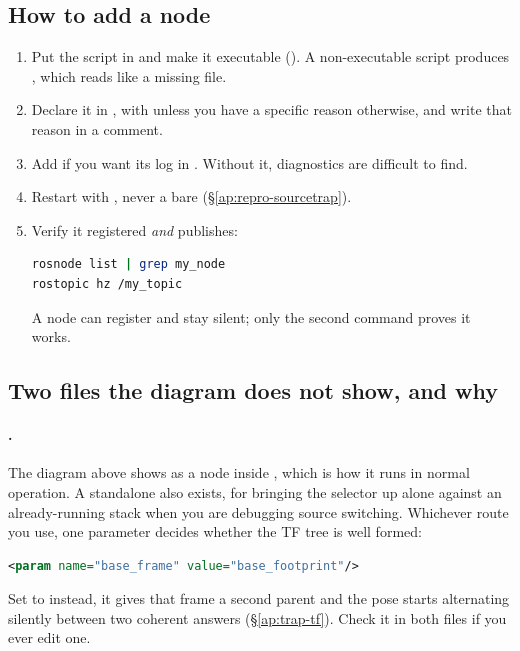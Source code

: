 \subsection{How to add a node}
\begin{enumerate}[leftmargin=1.4em]
\item Put the script in
   and make it executable
  (). A non-executable script produces
  , which reads like a missing file.
\item Declare it in , with
   unless you have a specific reason
  otherwise, and write that reason in a comment.
\item Add  if you want its log in
  . Without it, diagnostics are difficult to
  find.
\item Restart with , never a bare
   (\S\ref{ap:repro-sourcetrap}).
\item Verify it registered \emph{and} publishes:
\begin{lstlisting}[language=bash]
rosnode list | grep my_node
rostopic hz /my_topic
\end{lstlisting}
  A node can register and stay silent; only the second command proves it works.
\end{enumerate}

\subsection{Two files the diagram does not show, and why}
\label{ap:launch-notshown}

\paragraph{.} The diagram above shows
 as a node inside
, which is how it runs in normal
operation. A standalone  also exists, for
bringing the selector up alone against an already-running stack when you are
debugging source switching. Whichever route you use, one parameter decides
whether the TF tree is well formed:
\begin{lstlisting}[language=XML]
<param name="base_frame" value="base_footprint"/>
\end{lstlisting}
Set to  instead, it gives that frame a second parent and the
pose starts alternating silently between two coherent answers
(\S\ref{ap:trap-tf}). Check it in both files if you ever edit one.

